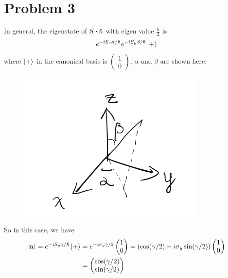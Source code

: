 \documentclass{article}
\begin{document}
\section*{Problem 3}

In general, the eigenstate of $S\vdot\hat{n}$ with eigen value
$\frac{\hbar}{2}$ is
\begin{equation}
    e^{-iS_z \alpha/\hbar}e^{-iS_y\beta/\hbar}\ket{+}
\end{equation}
where $\ket{+}$ in the canonical basis is $ \begin{pmatrix}
    1\\0
\end{pmatrix}$, $\alpha$ and $\beta$ are shown here:
\begin{figure}[H]
    \centering
    \includegraphics[width=0.4\linewidth]{pic1.png}
\end{figure}

So in this case, we have
\begin{align*}
    \ket{\vb{n}} = e^{-iS_y\gamma/\hbar}\ket{+} &=
    e^{-i\sigma_y\gamma/2} \begin{pmatrix}
        1 \\ 0
    \end{pmatrix} =
    \left(\cos(\gamma/2)-i\sigma_y\sin(\gamma/2)\right)
    \begin{pmatrix}
        1 \\ 0
    \end{pmatrix} \\
    &= \begin{pmatrix}
    \cos(\gamma/2) \\ \sin(\gamma/2)
    \end{pmatrix}
\end{align*}
\end{document}
